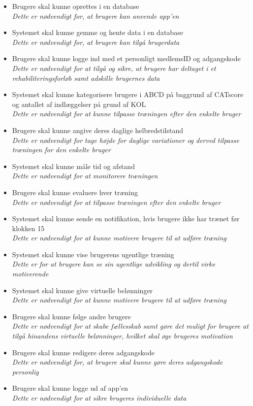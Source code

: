 \noindent 
\begin{itemize}
\item Brugere skal kunne oprettes i en database
	\\
	\textit{Dette er nødvendigt for, at brugere kan anvende app'en}
	\item Systemet skal kunne gemme og hente data i en database
\\
\textit{Dette er nødvendigt for, at brugere kan tilgå brugerdata}
\item Brugere skal kunne logge ind med et personligt medlemsID og adgangskode
	\\
	\textit{Dette er nødvendigt for at tilgå og sikre, at brugere har deltaget i et rehabiliteringsforløb samt adskille brugernes data}
\item Systemet skal kunne kategorisere brugere i ABCD på baggrund af CATscore og  antallet af indlæggelser på grund af KOL
	\\
	\textit{Dette er nødvendigt for at kunne tilpasse træningen efter den enkelte bruger}
\item Brugere skal kunne angive deres daglige helbredstilstand 
	\\
\textit{Dette er nødvendigt for tage højde for daglige variationer og derved tilpasse træningen for den enkelte bruger}
\item Systemet skal kunne måle tid og afstand
	\\
\textit{Dette er nødvendigt for at monitorere træningen}
\item Brugere skal kunne evaluere hver træning
	\\
\textit{Dette er nødvendigt for at tilpasse træningen efter den enkelte bruger}		
\item Systemet skal kunne sende en notifikation, hvis brugere ikke har trænet før klokken 15 
	\\
	\textit{Dette er nødvendigt for at kunne motivere brugere til at udføre træning}
\item Systemet skal kunne vise brugerens ugentlige træning
\\
\textit{Dette er for at brugere kan se sin ugentlige udvikling og dertil virke motiverende}	
	\item Systemet skal kunne give virtuelle belønninger 
	\\
	\textit{Dette er nødvendigt for at kunne motivere brugere til at udføre træning}
\item Brugere skal kunne følge andre brugere 
	\\
	\textit{Dette er nødvendigt for at skabe fællesskab samt gøre det muligt for brugere at tilgå hinandens virtuelle belønninger, hvilket skal øge brugeres motivation}
\item Brugere skal kunne redigere deres adgangskode
	\\
	\textit{Dette er nødvendigt for, at brugere skal kunne gøre deres adgangskode personlig}
\item Brugere skal kunne logge ud af app'en
	\\
	\textit{Dette er nødvendigt for at sikre brugeres individuelle data}
\end{itemize}


